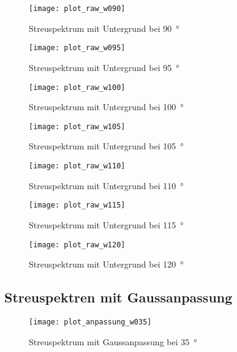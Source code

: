 \documentclass[11pt, ngerman, fleqn, DIV=15, headinclude, BCOR=2cm]{scrreprt}
\begin{document}
\begin{appendix}
\begin{figure}[h]
    \centering
    \texttt{[image: plot\_raw\_w090]}
    \caption{%
	    Streuspektrum mit Untergrund bei \SI{90}{\degree}
    }
    \label{fig:plot_raw_w090}
\end{figure}

\begin{figure}[h]
    \centering
    \texttt{[image: plot\_raw\_w095]}
    \caption{%
	    Streuspektrum mit Untergrund bei \SI{95}{\degree}
    }
    \label{fig:plot_raw_w095}
\end{figure}

\begin{figure}[h]
    \centering
    \texttt{[image: plot\_raw\_w100]}
    \caption{%
	    Streuspektrum mit Untergrund bei \SI{100}{\degree}
    }
    \label{fig:plot_raw_w100}
\end{figure}

\begin{figure}[h]
    \centering
    \texttt{[image: plot\_raw\_w105]}
    \caption{%
	    Streuspektrum mit Untergrund bei \SI{105}{\degree}
    }
    \label{fig:plot_raw_w105}
\end{figure}

\begin{figure}[h]
    \centering
    \texttt{[image: plot\_raw\_w110]}
    \caption{%
	    Streuspektrum mit Untergrund bei \SI{110}{\degree}
    }
    \label{fig:plot_raw_w110}
\end{figure}

\begin{figure}[h]
    \centering
    \texttt{[image: plot\_raw\_w115]}
    \caption{%
	    Streuspektrum mit Untergrund bei \SI{115}{\degree}
    }
    \label{fig:plot_raw_w115}
\end{figure}

\begin{figure}[h]
    \centering
    \texttt{[image: plot\_raw\_w120]}
    \caption{%
	    Streuspektrum mit Untergrund bei \SI{120}{\degree}
    }
    \label{fig:plot_raw_w120}
\end{figure}

\clearpage

\subsection{Streuspektren mit Gaussanpassung}
\label{anhang-streuspektren-gauss}
\begin{figure}[h]
    \centering
    \texttt{[image: plot\_anpassung\_w035]}
    \caption{%
	    Streuspektrum mit Gaussanpassung bei \SI{35}{\degree}
    }
    \label{fig:plot_anpassung_w035}
\end{figure}


\end{appendix}
\end{document}
